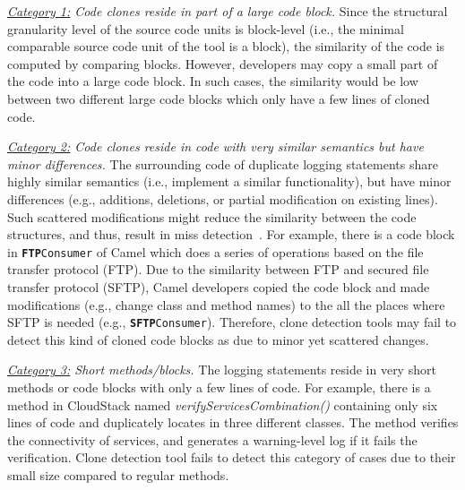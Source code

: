 {\em \underline{Category 1:} Code clones reside in part of a large code block.} Since the structural granularity level of the source code units is block-level (i.e., the minimal comparable source code unit of the tool is a block), the similarity of the code is computed by comparing blocks. However, developers may copy a small part of the code into a large code block. In such cases, the similarity would be low between two different large code blocks which only have a few lines of cloned code.  %

{\em \underline{Category 2:} Code clones reside in code with very similar semantics but have minor differences.} The surrounding code of duplicate logging statements share highly similar semantics (i.e., implement a similar functionality), but have minor differences (e.g., additions, deletions, or partial modification on existing lines). Such scattered modifications might reduce the similarity between the code structures, and thus, result in miss detection~\cite{ROY2009470,nicad}. For example, there is a code block in {\tt\small \textbf{FTP}Consumer} of Camel which does a series of operations based on the file transfer protocol (FTP). %
Due to the similarity between FTP and secured file transfer protocol (SFTP), Camel developers copied the code block and made modifications (e.g., change class and method names) to the all the places where SFTP is needed (e.g., {\tt\small \textbf{SFTP}Consumer}). Therefore, clone detection tools may fail to detect this kind of cloned code blocks as due to minor yet scattered changes.

{\em \underline{Category 3:} Short methods/blocks.}
The logging statements reside in very short methods or code blocks with only a few lines of code. For example, there is a method in CloudStack named {\em verifyServicesCombination()} containing only six lines of code and duplicately locates in three different classes. The method verifies the connectivity of services, and generates a warning-level log if it fails the verification. Clone detection tool fails to detect this category of cases due to their small size compared to regular methods.

